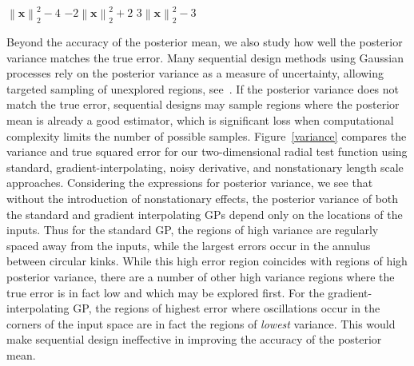 \documentclass{article}
\newcommand{\norm}[1]{\left\lVert#1\right\rVert}
\renewcommand{\vec}[1]{\mathbf{#1}}
\begin{document}
\begin{algorithm}
    \captionsetup{justification=centering}
    \begin{algorithmic}
    \IF{$g_1(\vec{x}) \geq 0$}
        \RETURN $\norm{\vec{x}}_2^2 - 4$
    \ELSIF{$g_2(\vec{x}) \geq 0$}
        \RETURN $-2\norm{\vec{x}}_2^2 + 2$
    \ELSE
        \RETURN $3\norm{\vec{x}}_2^2 - 3$
    \ENDIF
    \end{algorithmic}
    \caption{: $g_1(\vec{x}) = \norm{\vec{x}}_2^2 - 2$, $g_2(\vec{x}) = \norm{\vec{x}}_2^2 - 1$}
	\label{radial-code}
\end{algorithm}

Beyond the accuracy of the posterior mean, we also study how well the posterior variance matches the true error. Many sequential design methods using Gaussian processes rely on the posterior variance as a measure of uncertainty, allowing targeted sampling of unexplored regions, see~\cite{jones1998efficient, ranjan2008sequential}. If the posterior variance does not match the true error, sequential designs may sample regions where the posterior mean is already a good estimator, which is significant loss when computational complexity limits the number of possible samples. Figure~\ref{variance} compares the variance and true squared error for our two-dimensional radial test function using standard, gradient-interpolating, noisy derivative, and nonstationary length scale approaches. Considering the expressions for posterior variance, we see that without the introduction of nonstationary effects, the posterior variance of both the standard and gradient interpolating GPs depend only on the locations of the inputs. Thus for the standard GP, the regions of high variance are regularly spaced away from the inputs, while the largest errors occur in the annulus between circular kinks. While this high error region coincides with regions of high posterior variance, there are a number of other high variance regions where the true error is in fact low and which may be explored first. For the gradient-interpolating GP, the regions of highest error where oscillations occur in the corners of the input space are in fact the regions of \textit{lowest} variance. This would make sequential design ineffective in improving the accuracy of the posterior mean.
\end{document}
